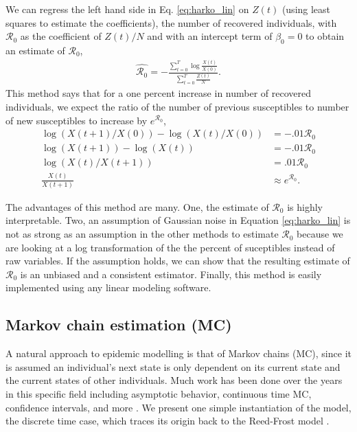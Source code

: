 \documentclass[12pt]{article}
\newcommand{\rr}{\ensuremath{\mathcal{R}_0}}
\begin{document}
We can regress the left hand side in Eq. \ref{eq:harko_lin} on $Z(t)$ (using least squares to estimate the coefficients), the number of recovered individuals, with $\rr$ as the coefficient of $Z(t)/N$ and with an intercept term of $\beta_0=0$ to obtain an estimate of $\rr$,
\begin{align*}
  \hat{\rr} = -\frac{\sum_{t=0}^T \log \frac{ X(t)}{X(0)}}{\sum_{t=0}^T\frac{Z(t)}{N}}.
\end{align*}
This method says that for a one percent increase in number of recovered individuals, we expect the ratio of the number of previous susceptibles to number of new susceptibles to increase by $e^{\rr}$,
\begin{align*}
  \log \left ( X(t+1)/ X(0) \right ) - \log \left ( X(t)/X(0) \right ) &= - .01\rr\\
  \log \left ( X(t+1) \right ) - \log \left ( X(t) \right )  &=- .01\rr\\
  \log \left ( X(t) / X(t+1) \right ) &= .01\rr\\
  \frac{X(t)}{X(t+1)}  &\approx e^{\rr}.
\end{align*}

The advantages of this method are many.  One, the estimate of $\rr$ is highly interpretable.  Two, an assumption of Gaussian noise in Equation \ref{eq:harko_lin} is not as strong as an assumption in the other methods to estimate $\rr$ because we are looking at a log transformation of the the percent of suceptibles instead of raw variables.  If the assumption holds, we can show that the resulting estimate of $\rr$ is an unbiased and a consistent estimator.  Finally,  this method is easily implemented using any linear modeling software.  

\subsection{Markov chain estimation (MC)}
A natural approach to epidemic modelling is that of Markov chains (MC), since it is assumed an individual's next state is only dependent on its current state and the current states of other individuals.  Much work has been done over the years in this specific field including asymptotic behavior, continuous time MC, confidence intervals, and more \citep{jacquez1991,gani1995,daley2001epidemic}.  We present one simple instantiation of the model, the discrete time case, which traces its origin back to the Reed-Frost model \citep{abbey1952}.
\end{document}
